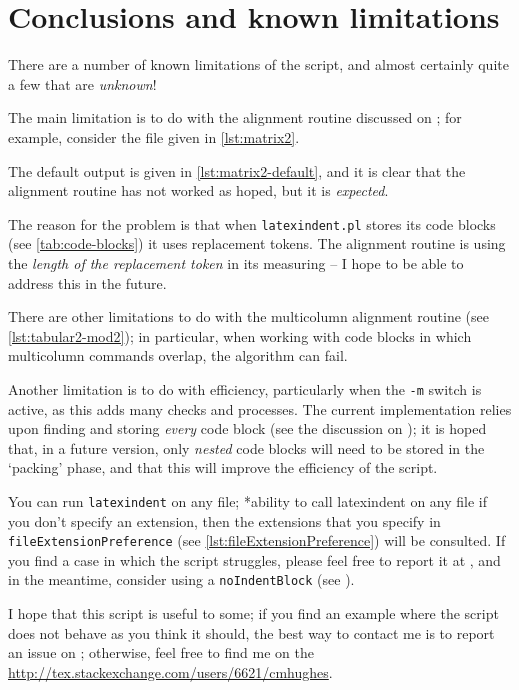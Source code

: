 \section{Conclusions and known limitations}\label{sec:knownlimitations}
 There are a number of known limitations of the script, and almost certainly quite a few
 that are \emph{unknown}!

 The main limitation is to do with the alignment routine discussed on
 ; for example, consider the file given in \cref{lst:matrix2}.


 The default output is given in \cref{lst:matrix2-default}, and it is clear that the alignment
 routine has not worked as hoped, but it is \emph{expected}. 

 The reason for the problem is that when \texttt{latexindent.pl} stores its code blocks
 (see \vref{tab:code-blocks}) it uses replacement tokens. The alignment routine is using
 the \emph{length of the replacement token} in its measuring -- I hope to be able to address this in the
 future.

 There are other limitations to do with the multicolumn alignment routine (see
 \vref{lst:tabular2-mod2}); in particular, when working with code blocks in which
 multicolumn commands overlap, the algorithm can fail.

 Another limitation is to do with efficiency, particularly when the \texttt{-m}
 switch is active, as this adds many checks and processes. The current implementation
 relies upon finding and storing \emph{every} code block (see the discussion on
 ); it is hoped that, in a future version, only
 \emph{nested} code blocks will need to be stored in the `packing' phase, and
 that this will improve the efficiency of the script.

 You can run \texttt{latexindent} on any file;%
 *{ability to call latexindent on any file} if you don't specify an extension, then the extensions that you
 specify in \lstinline[breaklines=true]!fileExtensionPreference! (see \vref{lst:fileExtensionPreference}) will be consulted. If you
 find a case in which the script struggles, please feel free to report it at
 \cite{latexindent-home}, and in the meantime, consider using a \texttt{noIndentBlock} (see ).

 I hope that this script is useful to some; if you find an example where the script does
 not behave as you think it should, the best way to contact me is to report an issue on
 \cite{latexindent-home}; otherwise, feel free to find me on the \url{http://tex.stackexchange.com/users/6621/cmhughes}.
